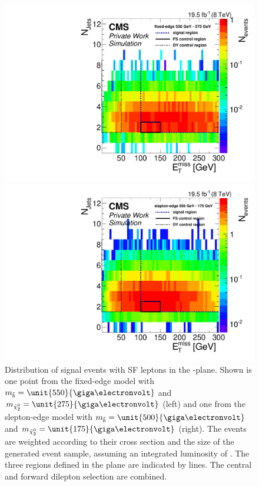 \begin{figure}[htbp]
\centering
\begin{minipage}[t]{0.49\textwidth}
  \includegraphics[width=\textwidth]{plots/SELECTION/metJetsScatter_SUSY_edge_550_275.pdf}
\end{minipage}
\begin{minipage}[t]{0.49\textwidth}
\includegraphics[width=\textwidth]{plots/SELECTION/metJetsScatter_SUSY_slepton_500_175.pdf}
\end{minipage}
\caption{Distribution of signal events with SF leptons in the \MET-\njets plane. Shown is one point from the fixed-edge model with $m_{\sbottom} = \unit{550}{\giga\electronvolt}$ and $m_{\secondchi} = \unit{275}{\giga\electronvolt}$ (left) and one from the slepton-edge model with $m_{\sbottom} = \unit{500}{\giga\electronvolt}$ and $m_{\secondchi} = \unit{175}{\giga\electronvolt}$ (right). The events are weighted according to their cross section and the size of the generated event sample, assuming an integrated luminosity of \lumi. The three regions defined in the plane are indicated by lines. The central and forward dilepton selection are combined.}
\label{fig:sigRegionSignal}
\end{figure}    

